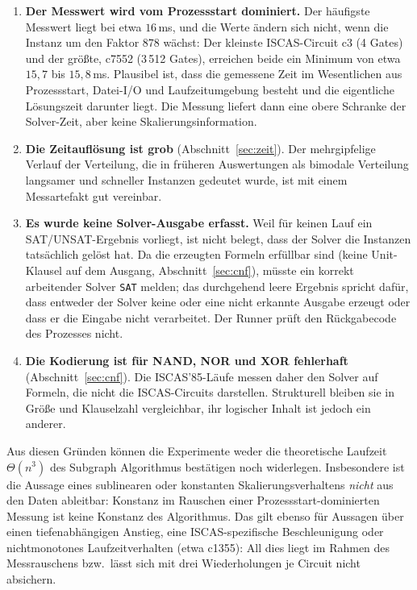 \documentclass[a4paper,12pt]{article}
\theoremstyle{definition}
\begin{document}
\begin{enumerate}
	\item \textbf{Der Messwert wird vom Prozessstart dominiert.} Der häufigste Messwert liegt bei etwa $16$\,ms, und die Werte ändern sich nicht, wenn die Instanz um den Faktor $878$ wächst: Der kleinste ISCAS-Circuit c3 (4 Gates) und der größte, c7552 (3\,512 Gates), erreichen beide ein Minimum von etwa $15{,}7$ bis $15{,}8$\,ms. Plausibel ist, dass die gemessene Zeit im Wesentlichen aus Prozessstart, Datei-I/O und Laufzeitumgebung besteht und die eigentliche Lösungszeit darunter liegt. Die Messung liefert dann eine obere Schranke der Solver-Zeit, aber keine Skalierungsinformation.
	\item \textbf{Die Zeitauflösung ist grob} (Abschnitt~\ref{sec:zeit}). Der mehrgipfelige Verlauf der Verteilung, die in früheren Auswertungen als bimodale Verteilung langsamer und schneller Instanzen gedeutet wurde, ist mit einem Messartefakt gut vereinbar.
	\item \textbf{Es wurde keine Solver-Ausgabe erfasst.} Weil für keinen Lauf ein SAT/UNSAT-Ergebnis vorliegt, ist nicht belegt, dass der Solver die Instanzen tatsächlich gelöst hat. Da die erzeugten Formeln erfüllbar sind (keine Unit-Klausel auf dem Ausgang, Abschnitt~\ref{sec:cnf}), müsste ein korrekt arbeitender Solver \texttt{SAT} melden; das durchgehend leere Ergebnis spricht dafür, dass entweder der Solver keine oder eine nicht erkannte Ausgabe erzeugt oder dass er die Eingabe nicht verarbeitet. Der Runner prüft den Rückgabecode des Prozesses nicht.
	\item \textbf{Die Kodierung ist für NAND, NOR und XOR fehlerhaft} (Abschnitt~\ref{sec:cnf}). Die ISCAS'85-Läufe messen daher den Solver auf Formeln, die nicht die ISCAS-Circuits darstellen. Strukturell bleiben sie in Größe und Klauselzahl vergleichbar, ihr logischer Inhalt ist jedoch ein anderer.
\end{enumerate}

Aus diesen Gründen können die Experimente weder die theoretische Laufzeit $\Theta(n^3)$ des Subgraph Algorithmus bestätigen noch widerlegen. Insbesondere ist die Aussage eines sublinearen oder konstanten Skalierungsverhaltens \emph{nicht} aus den Daten ableitbar: Konstanz im Rauschen einer Prozessstart-dominierten Messung ist keine Konstanz des Algorithmus. Das gilt ebenso für Aussagen über einen tiefenabhängigen Anstieg, eine ISCAS-spezifische Beschleunigung oder nichtmonotones Laufzeitverhalten (etwa c1355): All dies liegt im Rahmen des Messrauschens bzw.\ lässt sich mit drei Wiederholungen je Circuit nicht absichern.
\end{document}
